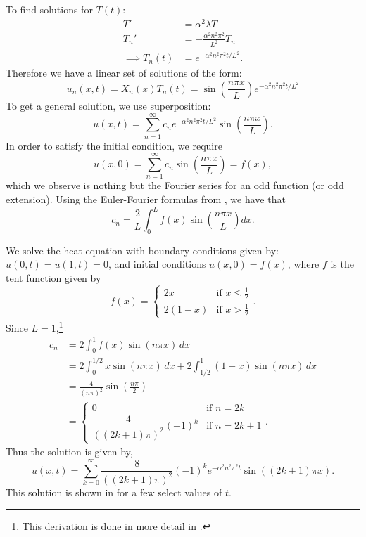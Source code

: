 To find solutions for $T(t)$:
\begin{align*}
	T' &= \alpha^2 \lambda T \\
	T_n' &= -\frac{\alpha^2 n^2 \pi^2}{L^2} T_n \\ 
	\implies T_n(t) &= e^{-\alpha^2 n^2 \pi^2 t/L^2}.
\end{align*}
Therefore we have a linear set of solutions of the form:
\[
u_n(x,t) = X_n(x)T_n(t) = \sin\left(\frac{n\pi x}{L}\right) e^{-\alpha^2 n^2 \pi^2 t/L^2}
\]
To get a general solution, we use superposition:
\begin{equation}
	u(x,t) = \sum_{n=1}^{\infty} c_n e^{-\alpha^2 n^2 \pi^2 t/L^2} \sin\left(\frac{n\pi x}{L}\right).
\end{equation}
In order to satisfy the initial condition, we require
\[
u(x,0) = \sum_{n=1}^{\infty} c_n \sin\left(\frac{n\pi x}{L}\right) = f(x),
\]
which we observe is nothing but the Fourier series for an odd function (or odd extension). Using the Euler-Fourier formulas from , we have that
\begin{equation}\label{eq:heatfourier}
	c_n = \frac{2}{L} \int_0^L f(x)\sin\left(\frac{n\pi x}{L}\right) dx.
\end{equation}

\begin{eg}\label{eg:heateqn1}
	We solve the heat equation with boundary conditions given by: $u(0,t) = u(1,t) = 0$, and initial conditions $u(x,0) = f(x)$, where $f$ is the tent function given by
	\[
	f(x) = \begin{cases} 2x & \text{if } x \leq \frac12 \\ 2(1-x) & \text{if } x>\frac12 \end{cases}.
	\]
	Since $L=1$,\footnote{This derivation is done in more detail in .}
	\begin{align*}
		c_n &= 2 \int_0^1 f(x) \sin(n\pi x) \,dx \\
		&= 2 \int_0^{1/2} x \sin(n\pi x) \,dx + 2 \int_{1/2}^1 (1-x) \sin(n\pi x) \,dx \\
		&= \frac{4}{(n \pi)^2} \sin \left(\frac{n \pi}{2}\right) \\
		&= \begin{cases}0 & \text{if } n = 2k \\ \dfrac{4}{((2k+1)\pi)^2} (-1)^k & \text{if } n = 2k+1\end{cases}.
	\end{align*}
	Thus the solution is given by, 
	\[
	u(x,t) = \sum_{k=0}^{\infty} \frac{8}{((2k+1)\pi)^2} (-1)^k e^{-\alpha^2 n^2 \pi^2 t} \sin\left((2k+1)\pi x\right).
	\]
	This solution is shown in  for a few select values of $t$.
\end{eg}

